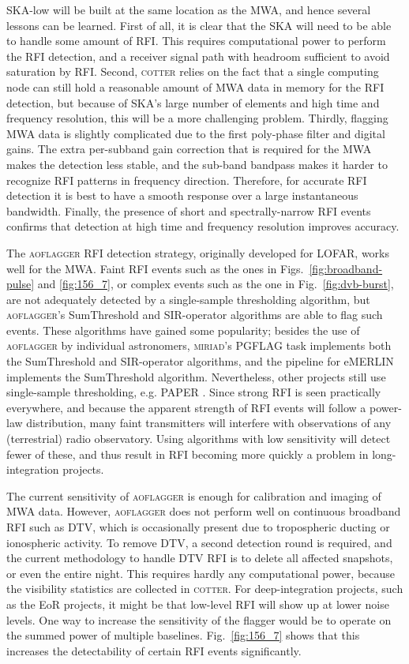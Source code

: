 \documentclass{pasa}
\begin{document}
SKA-low will be built at the same location as the MWA, and hence several lessons can be learned. First of all, it is clear that the SKA will need to be able to handle some amount of RFI. This requires computational power to perform the RFI detection, and a receiver signal path with headroom sufficient to avoid saturation by RFI. Second, \textsc{cotter} relies on the fact that a single computing node can still hold a reasonable amount of MWA data in memory for the RFI detection, but because of SKA's large number of elements and high time and frequency resolution, this will be a more challenging problem. Thirdly, flagging MWA data is slightly complicated due to the first poly-phase filter and digital gains. The extra per-subband gain correction that is required for the MWA makes the detection less stable, and the sub-band bandpass makes it harder to recognize RFI patterns in frequency direction. Therefore, for accurate RFI detection it is best to have a smooth response over a large instantaneous bandwidth. Finally, the presence of short and spectrally-narrow RFI events confirms that detection at high time and frequency resolution improves accuracy.

The \textsc{aoflagger} RFI detection strategy, originally developed for LOFAR, works well for the MWA. Faint RFI events such as the ones in Figs.~\ref{fig:broadband-pulse} and \ref{fig:156_7}, or complex events such as the one in Fig.~\ref{fig:dvb-burst}, are not adequately detected by a single-sample thresholding algorithm, but \textsc{aoflagger}'s SumThreshold and SIR-operator algorithms are able to flag such events. These algorithms have gained some popularity; besides the use of \textsc{aoflagger} by individual astronomers, \textsc{miriad}'s PGFLAG task implements both the SumThreshold and SIR-operator algorithms, and the pipeline for eMERLIN \citep{serpent-peck-2013} implements the SumThreshold algorithm. Nevertheless, other projects still use single-sample thresholding, e.g. PAPER \citep{parsons-paper-eorlimit-2014}. Since strong RFI is seen practically everywhere, and because the apparent strength of RFI events will follow a power-law distribution, many faint transmitters will interfere with observations of any (terrestrial) radio observatory. Using algorithms with low sensitivity will detect fewer of these, and thus result in RFI becoming more quickly a problem in long-integration projects.

The current sensitivity of \textsc{aoflagger} is enough for calibration and imaging of MWA data. However, \textsc{aoflagger} does not perform well on continuous broadband RFI such as DTV, which is occasionally present due to tropospheric ducting or ionospheric activity. To remove DTV, a second detection round is required, and the current methodology to handle DTV RFI is to delete all affected snapshots, or even the entire night. This requires hardly any computational power, because the visibility statistics are collected in \textsc{cotter}. For deep-integration projects, such as the EoR projects, it might be that low-level RFI will show up at lower noise levels. One way to increase the sensitivity of the flagger would be to operate on the summed power of multiple baselines. Fig.~\ref{fig:156_7} shows that this increases the detectability of certain RFI events significantly. 
\end{document}
